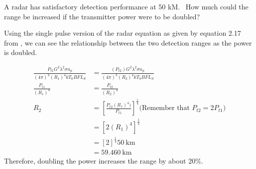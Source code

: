 \documentclass[12pt]{article}
\newenvironment{exercise}[2][Exercise]{\begin{trivlist}
    \item[\hskip \labelsep {\bfseries #1}\hskip \labelsep {\bfseries #2.}]}{\end{trivlist}}
\begin{document}
      \begin{exercise}{7}
      A radar has satisfactory detection performance at 50 kM.  How much could the range be increased if the transmitter power were to be doubled?

      Using the single pulse version of the radar equation as given by equation 2.17 from \cite[p.~68]{POMR}, we can see the relationship between the two detection ranges as the power is doubled.

      \begin{align*}
      \frac{P_{t1}G^{2}\lambda^{2}\sigma n_{p}}{(4\pi)^{3}(R_{1})^{4} k T_{0} B F L_{S}} & = \frac{(P_{t2})G^{2}\lambda^{2}\sigma n_{p}}{(4\pi)^{3}(R_{2})^{4} k T_{0} B F L_{S}}\\
      \frac{P_{t1}}{(R_{1})^{4}} & = \frac{P_{t2}}{(R_{2})^{4}}\\
      R_{2} & = \left[\frac{P_{t2}(R_{1})^{4})}{P_{t1}}\right]^{\frac{1}{4}} \text{(Remember that $P_{t2} = 2 P_{t1}$)}\\
      & = \left[2(R_{1})^{4}\right]^{\frac{1}{4}}\\
      & = \left[2\right]^{\frac{1}{4}}\SI{50}{\km}\\
      & = \SI{59.460}{\km}
      \end{align*}
      Therefore, doubling the power increases the range by about 20\%.
      \end{exercise}
      
\end{document}
